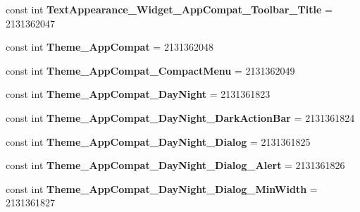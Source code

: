 \begin{DoxyCompactItemize}
const int {\bfseries Text\+Appearance\+\_\+\+Widget\+\_\+\+App\+Compat\+\_\+\+Toolbar\+\_\+\+Title} = 2131362047
\item 
\mbox{\label{class_sample_app_1_1_droid_1_1_resource_1_1_style_ae606c3a1bddee9b2095acea14fa7c643}} 
const int {\bfseries Theme\+\_\+\+App\+Compat} = 2131362048
\item 
\mbox{\label{class_sample_app_1_1_droid_1_1_resource_1_1_style_a17852c5489f916577c9e7ff167d17cac}} 
const int {\bfseries Theme\+\_\+\+App\+Compat\+\_\+\+Compact\+Menu} = 2131362049
\item 
\mbox{\label{class_sample_app_1_1_droid_1_1_resource_1_1_style_a6bc19b4a8f5f25d4c66765e6102d041c}} 
const int {\bfseries Theme\+\_\+\+App\+Compat\+\_\+\+Day\+Night} = 2131361823
\item 
\mbox{\label{class_sample_app_1_1_droid_1_1_resource_1_1_style_aa3823b78e8df13611f281f54178dd2ac}} 
const int {\bfseries Theme\+\_\+\+App\+Compat\+\_\+\+Day\+Night\+\_\+\+Dark\+Action\+Bar} = 2131361824
\item 
\mbox{\label{class_sample_app_1_1_droid_1_1_resource_1_1_style_a7c6b8a52c81c634255d9f2e2ae039b32}} 
const int {\bfseries Theme\+\_\+\+App\+Compat\+\_\+\+Day\+Night\+\_\+\+Dialog} = 2131361825
\item 
\mbox{\label{class_sample_app_1_1_droid_1_1_resource_1_1_style_a1800e5afbec46ee3698d2ad9ccfc3038}} 
const int {\bfseries Theme\+\_\+\+App\+Compat\+\_\+\+Day\+Night\+\_\+\+Dialog\+\_\+\+Alert} = 2131361826
\item 
\mbox{\label{class_sample_app_1_1_droid_1_1_resource_1_1_style_ac4d56e1a81435ca33a1707e41358b641}} 
const int {\bfseries Theme\+\_\+\+App\+Compat\+\_\+\+Day\+Night\+\_\+\+Dialog\+\_\+\+Min\+Width} = 2131361827
\item 
\mbox{\label{class_sample_app_1_1_droid_1_1_resource_1_1_style_a0acf5d2f8eab87c35b5b9312bc1673d2}} 

\end{DoxyCompactItemize}
